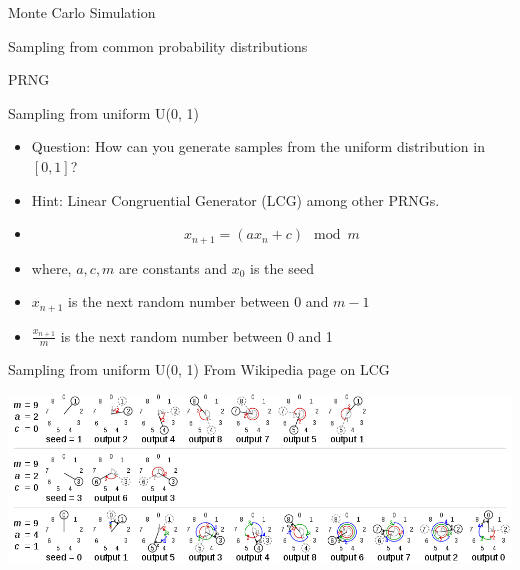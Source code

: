 \documentclass{beamer}
\begin{document}
\begin{section}{Monte Carlo Simulation}

    
\end{section}


\begin{section}{Sampling from common probability distributions}
    \begin{subsection}{PRNG}

    \begin{frame}{Sampling from uniform U(0, 1)}
        
    
    \begin{itemize}
        \item Question: How can you generate samples from the uniform distribution in $[0, 1]$?
        \item \pause Hint: Linear Congruential Generator (LCG) among other PRNGs.
        \item \pause \begin{equation}
            x_{n+1} = (a x_n + c) \mod m
        \end{equation}
        \item  where, $a, c, m$ are constants and $x_0$ is the seed
        \item $x_{n+1}$ is the next random number between 0 and $m-1$
        \item \pause $\frac{x_{n+1}}{m}$ is the next random number between 0 and 1
    

    \end{itemize}
\end{frame}

\begin{frame}{Sampling from uniform U(0, 1)}
    From Wikipedia page on LCG

    \includegraphics[width=\columnwidth]{../figures/wiki-LCG.png}
    

\end{frame}
\end{subsection}
\end{section}
\end{document}
